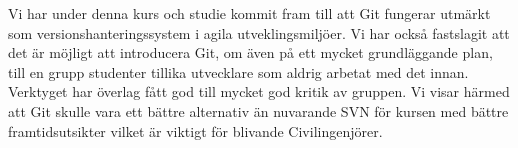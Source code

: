 Vi har under denna kurs och studie kommit fram till att Git fungerar utmärkt som versionshanteringssystem i agila utveklingsmiljöer. Vi har också fastslagit att det är möjligt att introducera Git, om även på ett mycket grundläggande plan, till en grupp studenter tillika utvecklare som aldrig arbetat med det innan. Verktyget har överlag fått god till mycket god kritik av gruppen. Vi visar härmed att Git skulle vara ett bättre alternativ än nuvarande SVN för kursen med bättre framtidsutsikter vilket är viktigt för blivande Civilingenjörer.  